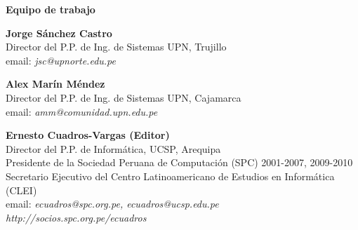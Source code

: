 \begin{center}
{\bf \Huge Equipo de trabajo}
\end{center}
\vspace{1cm}

\begin{center}
\textbf{Jorge Sánchez Castro}\\
Director del P.P. de Ing. de Sistemas UPN, Trujillo\\
email: \textit{jsc@upnorte.edu.pe}\\
\end{center}

\begin{center}
\textbf{Alex Marín Méndez}\\
Director del P.P. de Ing. de Sistemas UPN, Cajamarca\\
email: \textit{amm@comunidad.upn.edu.pe}\\
\end{center}


\begin{center}
\textbf{Ernesto Cuadros-Vargas (Editor)}\\
Director del P.P. de Informática, UCSP, Arequipa\\ %
Presidente de la Sociedad Peruana de Computación (SPC) 2001-2007, 2009-2010\\
Secretario Ejecutivo del Centro Latinoamericano de Estudios en Informática (CLEI)\\
email: \textit{ecuadros@spc.org.pe, ecuadros@ucsp.edu.pe}\\
\textit{http://socios.spc.org.pe/ecuadros}
\end{center}


